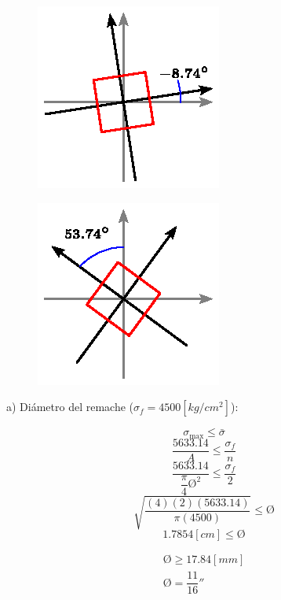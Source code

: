 \documentclass[letter,10pt,twoside]{article}
\begin{document}
\begin{figure}[H]
\centering
\includegraphics[scale=1.6]{resources/f92.eps}
\end{figure}

\begin{figure}[H]
\centering
\includegraphics[scale=1.6]{resources/f93.eps}
\end{figure}

a) Diámetro del remache ($\sigma_f = 4500[kg/cm^2]$):

\begin{equation*}
    \sigma_{\text{max}} \le \bar{\sigma}
\end{equation*}
\begin{equation*}
    \frac{5633.14}{A} \le \frac{\sigma_f}{n}
\end{equation*}
\begin{equation*}
    \frac{5633.14}{\dfrac{\pi}{4} \text{\O}^2} \le \frac{\sigma_f}{2}
\end{equation*}
\begin{equation*}
    \sqrt{\frac{(4)(2)(5633.14)}{\pi(4500)}} \le \text{\O}
\end{equation*}
\begin{equation*}
    1.7854[cm] \le \text{\O}
\end{equation*}

\begin{equation*}
\boxed{
    \begin{array}{l}
        \text{\O} \ge 17.84[mm] \\
        \text{\O} = \dfrac{11}{16}''
    \end{array}
}
\end{equation*}
\end{document}
